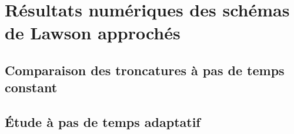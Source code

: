 
\section{Résultats numériques des schémas de Lawson approchés}

\subsection{Comparaison des troncatures à pas de temps constant}

\subsection{Étude à pas de temps adaptatif}



